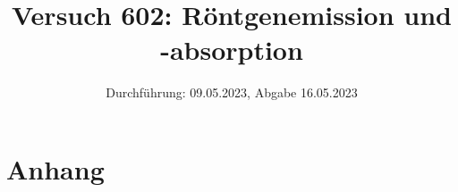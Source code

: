

\title{Versuch 602: Röntgenemission und -absorption}
\date{Durchführung: 09.05.2023, Abgabe 16.05.2023}


\maketitle
\thispagestyle{empty} 
\tableofcontents
\newpage
\setcounter{page}{1}






\printbibliography
\newpage

\section*{Anhang}


